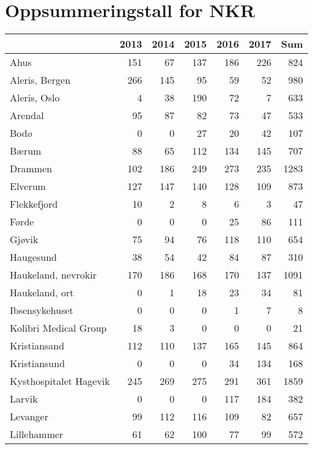 \documentclass [norsk,a4paper,twoside]{article}\usepackage[]{graphicx}\usepackage[]{color}
\begin{document}
\clearpage



\section{Oppsummeringstall for NKR}

\begin{table}[ht]
\centering
\begin{tabular}{lrrrrrr}
  \hline
 & 2013 & 2014 & 2015 & 2016 & 2017 & Sum \\ 
  \hline
Ahus & 151 & 67 & 137 & 186 & 226 & 824 \\ 
  Aleris, Bergen & 266 & 145 & 95 & 59 & 52 & 980 \\ 
  Aleris, Oslo & 4 & 38 & 190 & 72 & 7 & 633 \\ 
  Arendal & 95 & 87 & 82 & 73 & 47 & 533 \\ 
  Bodø & 0 & 0 & 27 & 20 & 42 & 107 \\ 
  Bærum & 88 & 65 & 112 & 134 & 145 & 707 \\ 
  Drammen & 102 & 186 & 249 & 273 & 235 & 1283 \\ 
  Elverum & 127 & 147 & 140 & 128 & 109 & 873 \\ 
  Flekkefjord & 10 & 2 & 8 & 6 & 3 & 47 \\ 
  Førde & 0 & 0 & 0 & 25 & 86 & 111 \\ 
  Gjøvik & 75 & 94 & 76 & 118 & 110 & 654 \\ 
  Haugesund & 38 & 54 & 42 & 84 & 87 & 310 \\ 
  Haukeland, nevrokir & 170 & 186 & 168 & 170 & 137 & 1091 \\ 
  Haukeland, ort & 0 & 1 & 18 & 23 & 34 & 81 \\ 
  Ibsensykehuset & 0 & 0 & 0 & 1 & 7 & 8 \\ 
  Kolibri Medical Group & 18 & 3 & 0 & 0 & 0 & 21 \\ 
  Kristiansand & 112 & 110 & 137 & 165 & 145 & 864 \\ 
  Kristiansund & 0 & 0 & 0 & 34 & 134 & 168 \\ 
  Kysthospitalet Hagevik & 245 & 269 & 275 & 291 & 361 & 1859 \\ 
  Larvik & 0 & 0 & 0 & 117 & 184 & 382 \\ 
  Levanger & 99 & 112 & 116 & 109 & 82 & 657 \\ 
  Lillehammer & 61 & 62 & 100 & 77 & 99 & 572 \\ 

\end{tabular}
\end{table}
\end{document}
